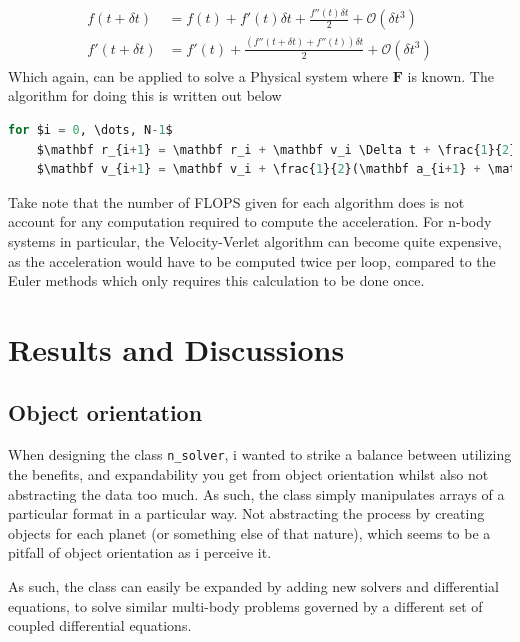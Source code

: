 \documentclass[10pt,showpacs,preprintnumbers,amsmath,amssymb,nofootinbib,aps,prl,twocolumn,groupedaddress,superscriptaddress,showkeys]{revtex4-1}
\begin{document}
    \begin{align}
      \begin{split}
        f(t + \delta t) &= f(t) + f'(t)\delta t + \frac{f''(t)\delta t}{2} + \mathcal O(\delta t^3) \\
        f'(t + \delta t) &= f'(t) + \frac{\left( f''(t + \delta t) + f''(t) \right)\delta t}{2} + \mathcal O(\delta t^3)
      \end{split}
    \end{align}
    Which again, can be applied to solve a Physical system where $\mathbf F$ is known. The algorithm for doing this is written out below
  \begin{lstlisting}[mathescape=true, language=python, title=Velocity-Verlet Algorithm (10N FLOPS)]
  for $i = 0, \dots, N-1$
    $\mathbf r_{i+1} = \mathbf r_i + \mathbf v_i \Delta t + \frac{1}{2}\mathbf a_i(\Delta t)^2$
    $\mathbf v_{i+1} = \mathbf v_i + \frac{1}{2}(\mathbf a_{i+1} + \mathbf a_i)\Delta t  $
  \end{lstlisting}

  Take note that the number of FLOPS given for each algorithm does is not account for any computation required to compute the acceleration. For n-body systems in particular, the Velocity-Verlet algorithm can become quite expensive, as the acceleration would have to be computed twice per loop, compared to the Euler methods which only requires this calculation to be done once.

\newpage

\section{Results and Discussions}
  \subsection{Object orientation}
    When designing the class \lstinline{n_solver}, i wanted to strike a balance between utilizing the benefits, and expandability you get from object orientation whilst also not abstracting the data too much. As such, the class simply manipulates arrays of a particular format in a particular way. Not abstracting the process by creating objects for each planet (or something else of that nature), which seems to be a pitfall of object orientation as i perceive it.

    As such, the class can easily be expanded by adding new solvers and differential equations, to solve similar multi-body problems governed by a different set of coupled differential equations.
\end{document}
